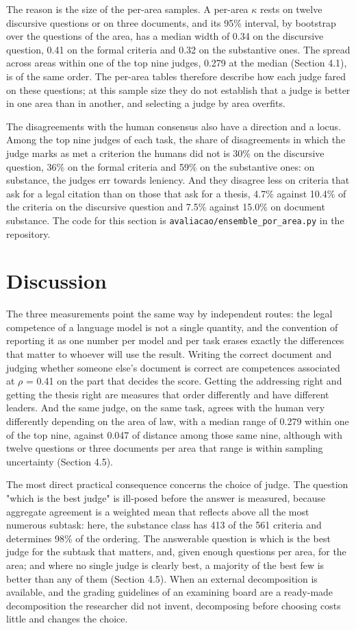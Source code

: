 \documentclass{IOS-Book-Article}
\begin{document}
The reason is the size of the per-area samples. A per-area $\kappa$ rests on twelve discursive questions or on three documents, and its 95\% interval, by bootstrap over the questions of the area, has a median width of 0.34 on the discursive question, 0.41 on the formal criteria and 0.32 on the substantive ones. The spread across areas within one of the top nine judges, 0.279 at the median (Section 4.1), is of the same order. The per-area tables therefore describe how each judge fared on these questions; at this sample size they do not establish that a judge is better in one area than in another, and selecting a judge by area overfits.

The disagreements with the human consensus also have a direction and a locus. Among the top nine judges of each task, the share of disagreements in which the judge marks as met a criterion the humans did not is 30\% on the discursive question, 36\% on the formal criteria and 59\% on the substantive ones: on substance, the judges err towards leniency. And they disagree less on criteria that ask for a legal citation than on those that ask for a thesis, 4.7\% against 10.4\% of the criteria on the discursive question and 7.5\% against 15.0\% on document substance. The code for this section is \texttt{avaliacao/ensemble\_por\_area.py} in the repository.

\section{Discussion}

The three measurements point the same way by independent routes: the legal competence of a language model is not a single quantity, and the convention of reporting it as one number per model and per task erases exactly the differences that matter to whoever will use the result. Writing the correct document and judging whether someone else's document is correct are competences associated at $\rho$ = 0.41 on the part that decides the score. Getting the addressing right and getting the thesis right are measures that order differently and have different leaders. And the same judge, on the same task, agrees with the human very differently depending on the area of law, with a median range of 0.279 within one of the top nine, against 0.047 of distance among those same nine, although with twelve questions or three documents per area that range is within sampling uncertainty (Section 4.5).

The most direct practical consequence concerns the choice of judge. The question "which is the best judge" is ill-posed before the answer is measured, because aggregate agreement is a weighted mean that reflects above all the most numerous subtask: here, the substance class has 413 of the 561 criteria and determines 98\% of the ordering. The answerable question is which is the best judge for the subtask that matters, and, given enough questions per area, for the area; and where no single judge is clearly best, a majority of the best few is better than any of them (Section 4.5). When an external decomposition is available, and the grading guidelines of an examining board are a ready-made decomposition the researcher did not invent, decomposing before choosing costs little and changes the choice.
\end{document}
